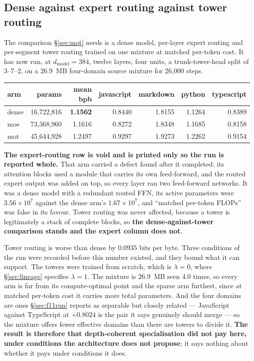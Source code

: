 \documentclass[11pt]{article}
\begin{document}
\subsection{Dense against expert routing against tower routing}
\label{sec:threeway}

The comparison \S\ref{sec:mot} needs is a dense model, per-layer expert routing and per-segment tower routing trained on one mixture at matched per-token cost. It has now run, at $d_{\mathrm{model}} = 384$, twelve layers, four units, a trunk-tower-head split of 3--7--2, on a 26.9~MB four-domain source mixture for 26{,}000 steps.

\begin{center}
\begin{tabular}{@{}lrrrrrr@{}}
\toprule
arm & params & mean bpb & javascript & markdown & python & typescript \\
\midrule
dense & 16{,}722{,}816 & \textbf{1.1562} & 0.8440 & 1.8155 & 1.1264 & 0.8389 \\
moe   & 73{,}368{,}960 & 1.1616 & 0.8272 & 1.8348 & 1.1685 & 0.8158 \\
mot   & 45{,}644{,}928 & 1.2497 & 0.9297 & 1.9273 & 1.2262 & 0.9154 \\
\bottomrule
\end{tabular}
\end{center}

\textbf{The expert-routing row is void and is printed only so the run is reported whole.} That arm carried a defect found after it completed: its attention blocks used a module that carries its own feed-forward, and the routed expert output was added on top, so every layer ran two feed-forward networks. It was a dense model with a redundant routed FFN, its active parameters were $3.56\times10^{7}$ against the dense arm's $1.67\times10^{7}$, and ``matched per-token FLOPs'' was false in its favour. Tower routing was never affected, because a tower is legitimately a stack of complete blocks, so \textbf{the dense-against-tower comparison stands and the expert column does not}.

Tower routing is worse than dense by $0.0935$ bits per byte. Three conditions of the run were recorded before this number existed, and they bound what it can support. The towers were trained from scratch, which is $\lambda = 0$, where \S\ref{sec:lineage} specifies $\lambda = 1$. The mixture is 26.9~MB seen 4.0 times, so every arm is far from its compute-optimal point and the sparse arm furthest, since at matched per-token cost it carries more total parameters. And the four domains are ones \S\ref{sec:f11run} reports as separable but closely related --- JavaScript against TypeScript at $+0.8024$ is the pair it says genuinely should merge --- so the mixture offers fewer effective domains than there are towers to divide it. \textbf{The result is therefore that depth-coherent specialisation did not pay here, under conditions the architecture does not propose}; it says nothing about whether it pays under conditions it does.
\end{document}
